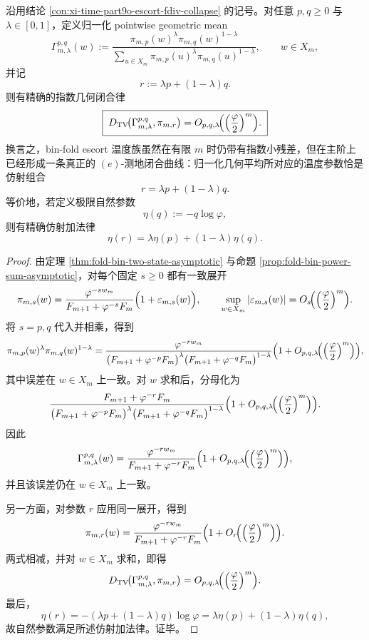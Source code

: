 \begin{theorem}\label{thm:xi-time-part9o-escort-egeodesic-affine-closure}
沿用结论 \ref{con:xi-time-part9o-escort-fdiv-collapse} 的记号。对任意 \(p,q\ge 0\) 与 \(\lambda\in[0,1]\)，定义归一化 pointwise geometric mean
\[
\Gamma_{m,\lambda}^{p,q}(w)
:=
\frac{\pi_{m,p}(w)^\lambda\pi_{m,q}(w)^{1-\lambda}}
{\sum_{u\in X_m}\pi_{m,p}(u)^\lambda\pi_{m,q}(u)^{1-\lambda}},
\qquad
w\in X_m,
\]
并记
\[
r:=\lambda p+(1-\lambda)q.
\]
则有精确的指数几何闭合律
\[
\boxed{\;
D_{\mathrm{TV}}\!\bigl(\Gamma_{m,\lambda}^{p,q},\pi_{m,r}\bigr)
=
O_{p,q,\lambda}\!\Bigl(\Bigl(\frac{\varphi}{2}\Bigr)^m\Bigr).\;}
\]
换言之，bin-fold escort 温度族虽然在有限 \(m\) 时仍带有指数小残差，但在主阶上已经形成一条真正的 \((e)\)-测地闭合曲线：归一化几何平均所对应的温度参数恰是仿射组合
\[
r=\lambda p+(1-\lambda)q.
\]
等价地，若定义极限自然参数
\[
\eta(q):=-q\log\varphi,
\]
则有精确仿射加法律
\[
\boxed{\;
\eta(r)=\lambda\eta(p)+(1-\lambda)\eta(q).\;}
\]
\end{theorem}
\begin{proof}
由定理 \ref{thm:fold-bin-two-state-asymptotic} 与命题 \ref{prop:fold-bin-power-sum-asymptotic}，对每个固定 \(s\ge 0\) 都有一致展开
\[
\pi_{m,s}(w)
=
\frac{\varphi^{-sw_m}}{F_{m+1}+\varphi^{-s}F_m}
\Bigl(1+\varepsilon_{m,s}(w)\Bigr),
\qquad
\sup_{w\in X_m}|\varepsilon_{m,s}(w)|
=
O_s\!\Bigl(\Bigl(\frac{\varphi}{2}\Bigr)^m\Bigr).
\]
将 \(s=p,q\) 代入并相乘，得到
\[
\pi_{m,p}(w)^\lambda\pi_{m,q}(w)^{1-\lambda}
=
\frac{\varphi^{-rw_m}}
{\bigl(F_{m+1}+\varphi^{-p}F_m\bigr)^\lambda
\bigl(F_{m+1}+\varphi^{-q}F_m\bigr)^{1-\lambda}}
\Bigl(1+O_{p,q,\lambda}\!\Bigl(\Bigl(\frac{\varphi}{2}\Bigr)^m\Bigr)\Bigr),
\]
其中误差在 \(w\in X_m\) 上一致。对 \(w\) 求和后，分母化为
\[
\frac{F_{m+1}+\varphi^{-r}F_m}
{\bigl(F_{m+1}+\varphi^{-p}F_m\bigr)^\lambda
\bigl(F_{m+1}+\varphi^{-q}F_m\bigr)^{1-\lambda}}
\Bigl(1+O_{p,q,\lambda}\!\Bigl(\Bigl(\frac{\varphi}{2}\Bigr)^m\Bigr)\Bigr).
\]
因此
\[
\Gamma_{m,\lambda}^{p,q}(w)
=
\frac{\varphi^{-rw_m}}{F_{m+1}+\varphi^{-r}F_m}
\Bigl(1+O_{p,q,\lambda}\!\Bigl(\Bigl(\frac{\varphi}{2}\Bigr)^m\Bigr)\Bigr),
\]
并且该误差仍在 \(w\in X_m\) 上一致。

另一方面，对参数 \(r\) 应用同一展开，得到
\[
\pi_{m,r}(w)
=
\frac{\varphi^{-rw_m}}{F_{m+1}+\varphi^{-r}F_m}
\Bigl(1+O_r\!\Bigl(\Bigl(\frac{\varphi}{2}\Bigr)^m\Bigr)\Bigr).
\]
两式相减，并对 \(w\in X_m\) 求和，即得
\[
D_{\mathrm{TV}}\!\bigl(\Gamma_{m,\lambda}^{p,q},\pi_{m,r}\bigr)
=
O_{p,q,\lambda}\!\Bigl(\Bigl(\frac{\varphi}{2}\Bigr)^m\Bigr).
\]
最后，
\[
\eta(r)=-(\lambda p+(1-\lambda)q)\log\varphi
=
\lambda\eta(p)+(1-\lambda)\eta(q),
\]
故自然参数满足所述仿射加法律。证毕。
\end{proof}

\endinput

